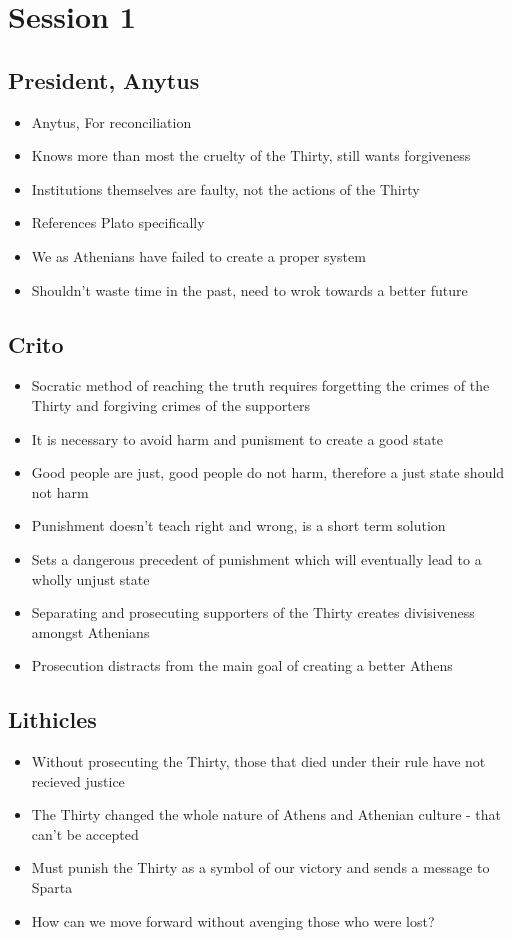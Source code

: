 \documentclass[11pt]{article}
\begin{document}
\section{Session 1}
\label{sec:orgc822367}
\subsection{President, Anytus}
\label{sec:orge6de2be}
\begin{itemize}
\item Anytus, For reconciliation
\item Knows more than most the cruelty of the Thirty, still wants forgiveness
\item Institutions themselves are faulty, not the actions of the Thirty
\item References Plato specifically
\item We as Athenians have failed to create a proper system
\item Shouldn't waste time in the past, need to wrok towards a better future
\end{itemize}
\subsection{Crito}
\label{sec:org4a84aed}
\begin{itemize}
\item Socratic method of reaching the truth requires forgetting the crimes of the Thirty and forgiving
crimes of the supporters
\item It is necessary to avoid harm and punisment to create a good state
\item Good people are just, good people do not harm, therefore a just state should not harm
\item Punishment doesn't teach right and wrong, is a short term solution
\item Sets a dangerous precedent of punishment which will eventually lead to a wholly unjust state
\item Separating and prosecuting supporters of the Thirty creates divisiveness amongst Athenians
\item Prosecution distracts from the main goal of creating a better Athens
\end{itemize}
\subsection{Lithicles}
\label{sec:orge1717fc}
\begin{itemize}
\item Without prosecuting the Thirty, those that died under their rule have not recieved justice
\item The Thirty changed the whole nature of Athens and Athenian culture - that can't be accepted
\item Must punish the Thirty as a symbol of our victory and sends a message to Sparta
\item How can we move forward without avenging those who were lost?
\end{itemize}
\end{document}
